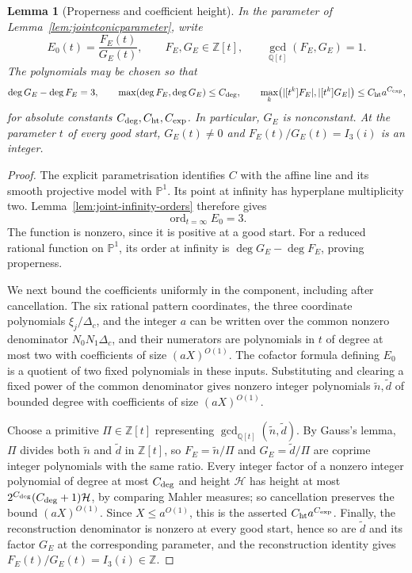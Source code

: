 \documentclass[11pt]{article}
\newtheorem{lemma}[theorem]{Lemma}
\theoremstyle{definition}
\theoremstyle{remark}
\begin{document}
\begin{lemma}[Properness and coefficient height]\label{lem:jointconicproper}
In the parameter of Lemma~\ref{lem:jointconicparameter}, write
\[
 E_0(t)=\frac{F_E(t)}{G_E(t)},\qquad F_E,G_E\in\mathbb Z[t],
 \qquad \gcd_{\mathbb Q[t]}(F_E,G_E)=1.
\]
The polynomials may be chosen so that
\[
 \deg G_E-\deg F_E=3,\qquad
 \max(\deg F_E,\deg G_E)\le C_{\rm deg},\qquad
 \max_k\bigl(|[t^k]F_E|,|[t^k]G_E|\bigr)\le C_{\rm ht}a^{C_{\rm exp}},
\]
for absolute constants $C_{\rm deg},C_{\rm ht},C_{\rm exp}$. In particular, $G_E$ is
nonconstant. At the parameter $t$ of every good start, $G_E(t)\ne0$ and
$F_E(t)/G_E(t)=I_3(i)$ is an integer.
\end{lemma}
\begin{proof}
The explicit parametrisation identifies $C$ with the affine line and
its smooth projective model with $\mathbb P^1$. Its point at infinity
has hyperplane multiplicity two. Lemma~\ref{lem:joint-infinity-orders} therefore gives
\[
 \operatorname{ord}_{t=\infty}E_0=3.
\]
The function is nonzero, since it is positive at a good start.
For a reduced rational function on $\mathbb P^1$, its order at infinity
is $\deg G_E-\deg F_E$, proving properness.

We next bound the coefficients uniformly in the component, including
after cancellation. The six rational pattern coordinates, the three coordinate
polynomials $\xi_j/\Delta_c$, and the integer $a$ can be written over the common
nonzero denominator $N_0N_1\Delta_c$, and their numerators are polynomials in $t$ of
degree at most two with coefficients of size $(aX)^{O(1)}$. The cofactor
formula defining $E_0$ is a quotient of two fixed polynomials in these inputs.
Substituting and clearing a fixed power of the common denominator gives
nonzero integer polynomials $\tilde n,\tilde d$ of bounded degree with
coefficients of size $(aX)^{O(1)}$.

Choose a primitive $\Pi\in\mathbb Z[t]$ representing
$\gcd_{\mathbb Q[t]}(\tilde n,\tilde d)$. By Gauss's lemma, $\Pi$ divides both
$\tilde n$ and $\tilde d$ in $\mathbb Z[t]$, so $F_E=\tilde n/\Pi$ and
$G_E=\tilde d/\Pi$ are coprime integer polynomials with the same ratio. Every
integer factor of a nonzero integer polynomial of degree at most $C_{\rm deg}$ and
height $\mathcal H$ has height at most $2^{C_{\rm deg}}(C_{\rm deg}+1)\mathcal H$, by
comparing Mahler measures; so cancellation preserves the bound
$(aX)^{O(1)}$. Since $X\le a^{O(1)}$, this is the asserted $C_{\rm ht}a^{C_{\rm exp}}$.
Finally, the reconstruction denominator is nonzero at every good start, hence
so are $\tilde d$ and its factor $G_E$ at the corresponding parameter, and the
reconstruction identity gives $F_E(t)/G_E(t)=I_3(i)\in\mathbb Z$.
\end{proof}
\end{document}
